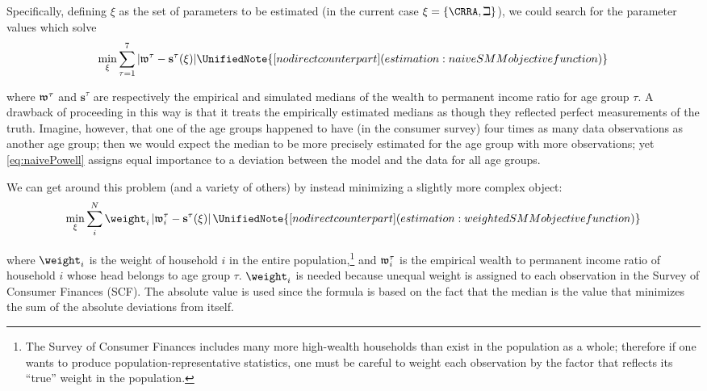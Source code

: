 Specifically, defining $\xi$ as the set of parameters
to be estimated (in the current case $\xi =\{\CRRA ,\beth\}$), we could search for
the parameter values which solve
  \begin{equation}
    \begin{gathered}
      \begin{aligned}
        \min_{\xi} \sum_{\tau=1}^{7} |\wRatio^{\tau} -\mathbf{s}^{\tau}(\xi)|  \label{eq:naivePowell}
        \UnifiedNote{[no direct counterpart] (estimation: naive SMM objective function)}
      \end{aligned}
    \end{gathered}
  \end{equation}

where $\mathfrak{w}^{\tau}$ and $\mathbf{s}^{\tau}$ are respectively the empirical
and simulated medians of the wealth to permanent income ratio for age group $\tau$.
A drawback of proceeding in this way is that it treats the empirically
estimated medians as though they reflected perfect measurements of the
truth. Imagine, however, that one of the age groups happened to have
(in the consumer survey) four times as many data observations as
another age group; then we would expect the median to be more
precisely estimated for the age group with more observations; yet
\eqref{eq:naivePowell} assigns equal importance to a deviation between
the model and the data for all age groups.

We can get around this problem (and a variety of others) by instead minimizing a slightly more complex object:
\hypertarget{eq-StructEstim}{}
  \begin{equation}
    \min_{\xi}\sum_{i}^{N}\weight _{i}\left|\wRatio_{i}^{\tau }-\mathbf{s}^{\tau}(\xi )\right|\label{eq:StructEstim}
    \UnifiedNote{[no direct counterpart] (estimation: weighted SMM objective function)}
  \end{equation}

where $\weight_{i}$ is the weight of household $i$ in the entire
population,\footnote{The Survey of Consumer Finances includes many
  more high-wealth households than exist in the population as a whole;
  therefore if one wants to produce population-representative
  statistics, one must be careful to weight each observation by the
  factor that reflects its ``true'' weight in the population.} and
$\mathfrak{w}_{i}^{\tau}$ is the empirical wealth to permanent income
ratio of household $i$ whose head belongs to age group
$\tau$. $\weight _{i}$ is needed because unequal weight is assigned to
each observation in the Survey of Consumer Finances (SCF). The
absolute value is used since the formula is based on the fact that the
median is the value that minimizes the sum of the absolute deviations
from itself.

